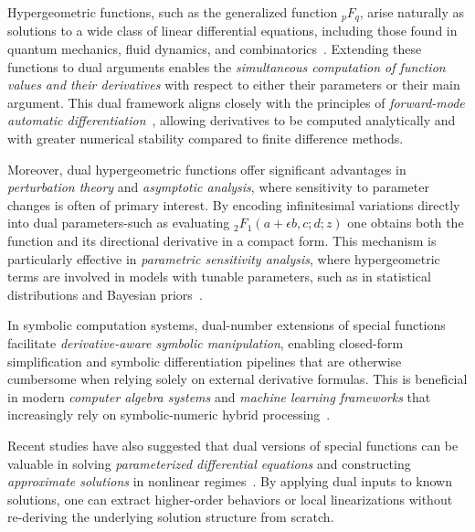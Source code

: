 \documentclass[11pt,a4paper,fleqn]{article}
\numberwithin{equation}{section}
\numberwithin{lemma}{section}
\numberwithin{theorem}{section}
\numberwithin{corollary}{section}
\begin{document}
	Hypergeometric functions, such as the generalized function ${}_pF_q$, arise naturally as solutions to a wide class of linear differential equations, including those found in quantum mechanics, fluid dynamics, and combinatorics~\cite{AAR,emo}. Extending these functions to dual arguments enables the \textit{simultaneous computation of function values and their derivatives} with respect to either their parameters or their main argument. This dual framework aligns closely with the principles of \textit{forward-mode automatic differentiation}~\cite{giles2008extended}, allowing derivatives to be computed analytically and with greater numerical stability compared to finite difference methods.
	
	Moreover, dual hypergeometric functions offer significant advantages in \textit{perturbation theory} and \textit{asymptotic analysis}, where sensitivity to parameter changes is often of primary interest. By encoding infinitesimal variations directly into dual parameters-such as evaluating ${}_2F_1(a + \epsilon b, c; d; z)$ one obtains both the function and its directional derivative in a compact form. This mechanism is particularly effective in \textit{parametric sensitivity analysis}, where hypergeometric terms are involved in models with tunable parameters, such as in statistical distributions and Bayesian priors~\cite{andrews1974scale, devroye1986non,fox1955moment}.
	
	In symbolic computation systems, dual-number extensions of special functions facilitate \textit{derivative-aware symbolic manipulation}, enabling closed-form simplification and symbolic differentiation pipelines that are otherwise cumbersome when relying solely on external derivative formulas. This is beneficial in modern \textit{computer algebra systems} and \textit{machine learning frameworks} that increasingly rely on symbolic-numeric hybrid processing~\cite{abadi2016tensorflow, davenport1993computer}.
	
	Recent studies have also suggested that dual versions of special functions can be valuable in solving \textit{parameterized differential equations} and constructing \textit{approximate solutions} in nonlinear regimes~\cite{bender1978advanced, hormander1983analysis, olver1993applications}. By applying dual inputs to known solutions, one can extract higher-order behaviors or local linearizations without re-deriving the underlying solution structure from scratch.
	
\end{document}
